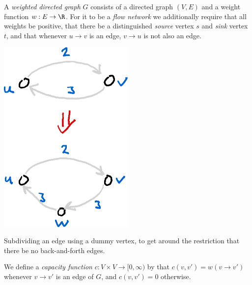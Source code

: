 \documentclass[nobib]{tufte-handout}
\begin{document}
  \begin{definition}
    A \emph{weighted directed graph} $G$ consists of a directed graph $(V,E)$ and a weight function $w: E \to \R$. For it to be a \emph{flow network} we additionally require that all weights be positive, that there be a distinguished \emph{source} vertex $s$ and \emph{sink} vertex $t$, and that whenever $u \to v$ is an edge, $v \to u$ is not also an edge.

    \begin{marginfigure}
        \centering
        \includegraphics[width=0.5\textwidth]{graphics/L7_flows/dummy_edge.png}
        \caption{Subdividing an edge using a dummy vertex, to get around the restriction that there be no back-and-forth edges.}
        \label{fig:dummy_edge}
    \end{marginfigure}

    We define a \emph{capacity function} $c: V\times V \to [0,\infty)$ by that $c(v,v') = w(v\to v')$ whenever $v\to v'$ is an edge of $G$, and $c(v,v') = 0$ otherwise.
  \end{definition}
\end{document}

